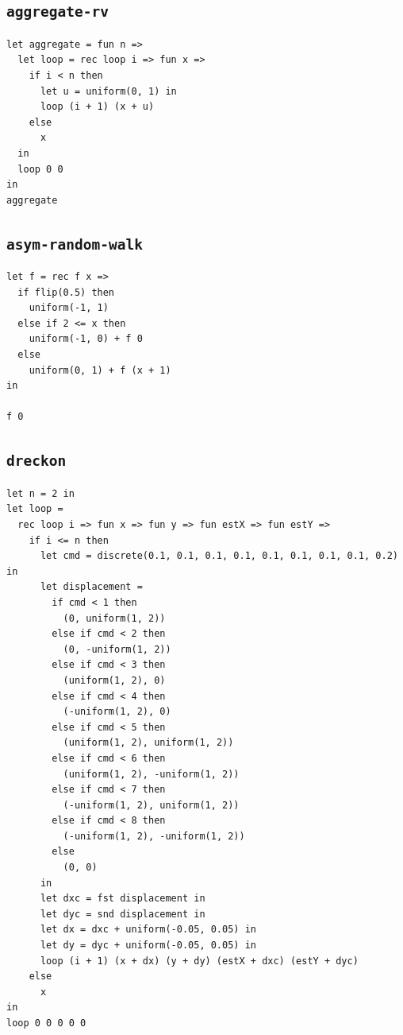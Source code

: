 \subsection{\texttt{aggregate-rv}}

\begin{lstlisting}[breaklines=true]
let aggregate = fun n =>
  let loop = rec loop i => fun x =>
    if i < n then
      let u = uniform(0, 1) in
      loop (i + 1) (x + u)
    else
      x
  in
  loop 0 0
in
aggregate
\end{lstlisting}

\subsection{\texttt{asym-random-walk}}

\begin{lstlisting}[breaklines=true]
let f = rec f x =>
  if flip(0.5) then
    uniform(-1, 1)
  else if 2 <= x then
    uniform(-1, 0) + f 0
  else
    uniform(0, 1) + f (x + 1)
in

f 0
\end{lstlisting}

\subsection{\texttt{dreckon}}

\begin{lstlisting}[breaklines=true]
let n = 2 in
let loop =
  rec loop i => fun x => fun y => fun estX => fun estY =>
    if i <= n then
      let cmd = discrete(0.1, 0.1, 0.1, 0.1, 0.1, 0.1, 0.1, 0.1, 0.2) in
      let displacement =
        if cmd < 1 then
          (0, uniform(1, 2))
        else if cmd < 2 then
          (0, -uniform(1, 2))
        else if cmd < 3 then
          (uniform(1, 2), 0)
        else if cmd < 4 then
          (-uniform(1, 2), 0)
        else if cmd < 5 then
          (uniform(1, 2), uniform(1, 2))
        else if cmd < 6 then
          (uniform(1, 2), -uniform(1, 2))
        else if cmd < 7 then
          (-uniform(1, 2), uniform(1, 2))
        else if cmd < 8 then
          (-uniform(1, 2), -uniform(1, 2))
        else
          (0, 0)
      in
      let dxc = fst displacement in
      let dyc = snd displacement in
      let dx = dxc + uniform(-0.05, 0.05) in
      let dy = dyc + uniform(-0.05, 0.05) in
      loop (i + 1) (x + dx) (y + dy) (estX + dxc) (estY + dyc)
    else
      x
in
loop 0 0 0 0 0
\end{lstlisting}

